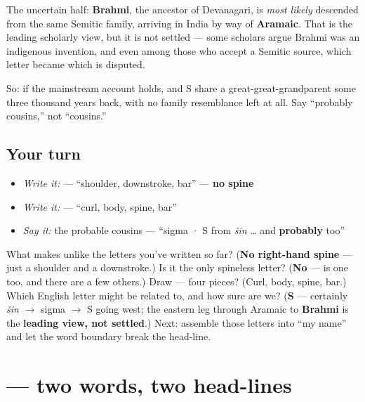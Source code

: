 The uncertain half: \textbf{Brahmi}, the ancestor of Devanagari, is \emph{most likely} descended from the same Semitic family, arriving in India by way of \textbf{Aramaic}. That is the leading scholarly view, but it is not settled — some scholars argue Brahmi was an indigenous invention, and even among those who accept a Semitic source, which letter became which is disputed.

So: if the mainstream account holds,  and S share a great-great-grandparent some three thousand years back, with no family resemblance left at all. Say \textquotedblleft{}probably cousins,\textquotedblright{} not \textquotedblleft{}cousins.\textquotedblright{}

\subsection*{Your turn}
\begin{itemize}
\raggedright
  \item \emph{Write it:}  — \textquotedblleft{}shoulder, downstroke, bar\textquotedblright{} — \textbf{no spine}
  \item \emph{Write it:}  — \textquotedblleft{}curl, body, spine, bar\textquotedblright{}
  \item \emph{Say it:} the probable cousins — \textquotedblleft{}sigma · S from \emph{šin} … and \textbf{probably}  too\textquotedblright{}
\end{itemize}

\begin{tcolorbox}[breakable,colback=teal!4,colframe=teal!35!black,title={Before you move on}]
What makes \textbf{} unlike the letters you've written so far? (\textbf{No right-hand spine} — just a shoulder and a downstroke.) Is it the only spineless letter? (\textbf{No} — \textbf{} is one too, and there are a few others.) Draw \textbf{} — four pieces? (Curl, body, spine, bar.) Which English letter might  be related to, and how sure are we? (\textbf{S} — certainly \emph{šin} $\to$ sigma $\to$ S going west; the eastern leg through Aramaic to \textbf{Brahmi} is the \textbf{leading view, not settled}.) Next: assemble those letters into \textquotedblleft{}my name\textquotedblright{} and let the word boundary break the head-line.
\end{tcolorbox}
\section[\texorpdfstring{\hi{मेरा} \hi{नाम} (merā nām)}{मेरा नाम (merā nām)}]{  — two words, two head-lines}

